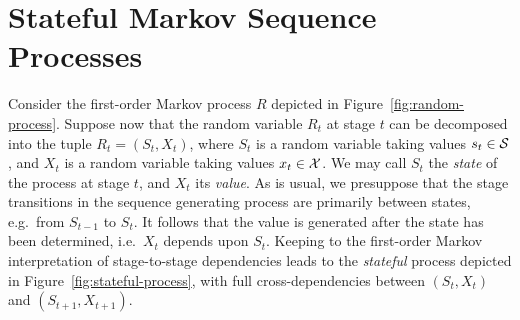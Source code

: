 \documentclass[a4paper]{article}
\begin{document}
\section{Stateful Markov Sequence Processes}
Consider the first-order Markov process $R$ depicted in Figure~\ref{fig:random-process}.
Suppose now that the random variable $R_t$ at stage $t$ can be decomposed into the tuple
$R_t=(S_t,X_t)$, where $S_t$ is a random variable taking values $s_t\in{\cal S}$, and $X_t$
is a random variable taking values $x_t\in{\cal X}$.
We may call $S_t$ the {\em state} of the process at stage $t$, and $X_t$ its {\em value}.
As is usual, we presuppose that the stage transitions in the sequence generating process are primarily between states, e.g.\ from $S_{t-1}$ to $S_t$.
It follows that the value is generated after the state has been determined, i.e.\ $X_t$ depends upon $S_t$.
Keeping to the first-order Markov interpretation of stage-to-stage dependencies leads to
the {\em stateful} process depicted in Figure~\ref{fig:stateful-process}, with full cross-dependencies between $(S_t,X_t)$ and
$(S_{t+1},X_{t+1})$.
\end{document}
